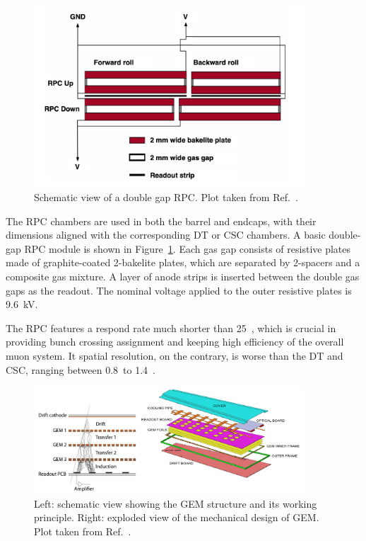\begin{figure}[!htb]
    \centering
    \captionsetup{justification=centering}
    \includegraphics[width=0.90\textwidth]{pics/LHC_CMS/RPC.png}
    \caption{Schematic view of a double gap RPC.
             Plot taken from Ref.~\cite{collaboration_2013}.}
    \label{fig:cms_rpc}
\end{figure}

The RPC chambers are used in both the barrel and endcaps, with their dimensions aligned with the corresponding DT or CSC chambers.
A basic double-gap RPC module is shown in Figure~\ref{fig:cms_rpc}. 
Each gas gap consists of resistive plates made of graphite-coated 2-\mm bakelite plates, 
which are separated by 2-\mm spacers and a composite gas mixture.
A layer of anode strips is inserted between the double gas gaps as the readout.
The nominal voltage applied to the outer resistive plates is 9.6~kV.

The RPC features a respond rate much shorter than 25~\ns,
which is crucial in providing bunch crossing assignment and keeping high efficiency of the overall muon system.
It spatial resolution, on the contrary, is worse than the DT and CSC, ranging between 0.8~\cm to 1.4~\cm.

\begin{figure}[!htb]
    \centering
    \captionsetup{justification=justified}
    \includegraphics[width=0.90\textwidth]{pics/LHC_CMS/GEM.png}
    \caption{Left: schematic view showing the GEM structure and its working principle.
             Right: exploded view of the mechanical design of GEM.
             Plot taken from Ref.~\cite{Colaleo:2021453}.}
    \label{fig:cms_gem}
\end{figure}

